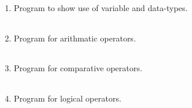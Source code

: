 \documentclass{exam}
\begin{document}
  \begin{enumerate}
   \item Program to show use of variable and data-types.

   \begin{myTableStyle}
   \begin{center} \begin{tabular}{ |m{14cm}| } \hline
              \\ \hline
    \end{tabular} \end{center}
\end{myTableStyle}
  \pagebreak

   \item  Program for arithmatic operators.

   \begin{myTableStyle}
   \begin{center} \begin{tabular}{ |m{14cm}| } \hline
              \\ \hline
    \end{tabular} \end{center}
\end{myTableStyle}
  \pagebreak

   \item  Program for comparative operators.

   \begin{myTableStyle}
   \begin{center} \begin{tabular}{ |m{14cm}| } \hline
              \\ \hline
    \end{tabular} \end{center}
\end{myTableStyle}
  \pagebreak

   \item  Program for logical operators.

   \begin{myTableStyle}
   \begin{center} \begin{tabular}{ |m{14cm}| } \hline
              \\ \hline
    \end{tabular} \end{center}
\end{myTableStyle}
  \pagebreak


\end{enumerate}
\end{document}
